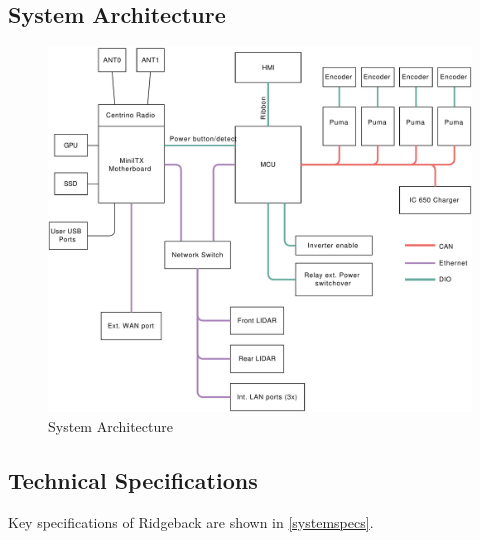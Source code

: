 \documentclass[]{clearpath-latex/clearpath-manual}
\begin{document}
\subsection{System Architecture}

\begin{figure}[!htb]
  \centering
  \includegraphics[width=0.75\linewidth]{ridgeback-logic-conn.pdf}
  \caption{System Architecture}
  \label{systemarchitecture}
\end{figure}

\clearpage

\subsection{Technical Specifications}

Key specifications of Ridgeback are shown in \autoref{systemspecs}.
\end{document}
